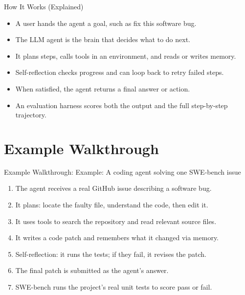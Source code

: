 \documentclass[10pt]{beamer}
\begin{document}
\begin{frame}[allowframebreaks]{How It Works (Explained)}
\begin{itemize}
  \item A user hands the agent a goal, such as fix this software bug.
  \item The LLM agent is the brain that decides what to do next.
  \item It plans steps, calls tools in an environment, and reads or writes memory.
  \item Self-reflection checks progress and can loop back to retry failed steps.
  \item When satisfied, the agent returns a final answer or action.
  \item An evaluation harness scores both the output and the full step-by-step trajectory.
\end{itemize}
\end{frame}
\section{Example Walkthrough}
\begin{frame}[allowframebreaks]{Example Walkthrough: Example: A coding agent solving one SWE-bench issue}
\begin{enumerate}
  \item The agent receives a real GitHub issue describing a software bug.
  \item It plans: locate the faulty file, understand the code, then edit it.
  \item It uses tools to search the repository and read relevant source files.
  \item It writes a code patch and remembers what it changed via memory.
  \item Self-reflection: it runs the tests; if they fail, it revises the patch.
  \item The final patch is submitted as the agent's answer.
  \item SWE-bench runs the project's real unit tests to score pass or fail.
\end{enumerate}
\end{frame}
\end{document}
